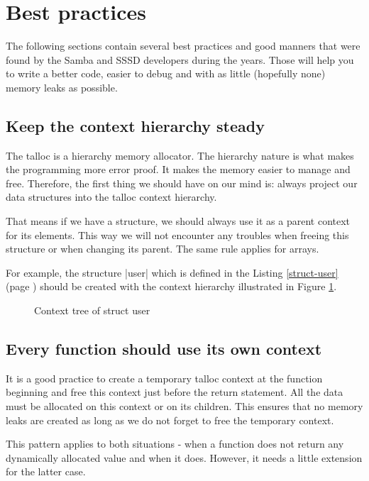 \section{Best practices}
\label{talloc:sec:best-practices}

The following sections contain several best practices and good manners that were
found by the Samba and SSSD developers during the years. Those will help you to
write a better code, easier to debug and with as little (hopefully none) memory
leaks as possible.

\subsection{Keep the context hierarchy steady}

The talloc is a hierarchy memory allocator. The hierarchy nature is what makes
the programming more error proof. It makes the memory easier to manage and free.
Therefore, the first thing we should have on our mind is: always project our
data structures into the talloc context hierarchy.

That means if we have a structure, we should always use it as a parent context
for its elements. This way we will not encounter any troubles when freeing this
structure or when changing its parent. The same rule applies for arrays.

For example, the structure |user| which is defined in the Listing
\ref{struct-user} (page \pageref{struct-user}) should be created with the
context hierarchy illustrated in Figure \ref{fig:bp-context-tree}.

\begin{figure}[H]
  \centering
  
  \caption{Context tree of struct user}
  \label{fig:bp-context-tree}
\end{figure}

\subsection{Every function should use its own context}
\label{talloc:subsec:function-use-own-context}

It is a good practice to create a temporary talloc context at the function
beginning and free this context just before the return statement. All the data
must be allocated on this context or on its children. This ensures that no
memory leaks are created as long as we do not forget to free the temporary
context.

This pattern applies to both situations - when a function does not return any
dynamically allocated value and when it does. However, it needs a little
extension for the latter case.

